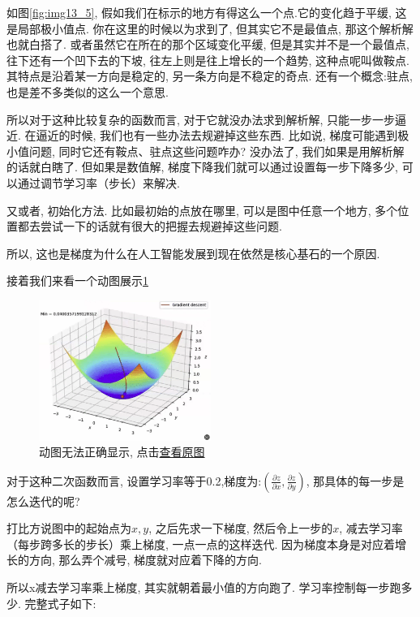 如图\ref{fig:img13_5}, 假如我们在标示的地方有得这么一个点.它的变化趋于平缓, 这是局部极小值点. 你在这里的时候以为求到了, 但其实它不是最值点, 那这个解析解也就白搭了. 或者虽然它在所在的那个区域变化平缓, 但是其实并不是一个最值点, 往下还有一个凹下去的下坡, 往左上则是往上增长的一个趋势, 这种点呢叫做鞍点. 其特点是沿着某一方向是稳定的, 另一条方向是不稳定的奇点. 还有一个概念:驻点, 也是差不多类似的这么一个意思. 

所以对于这种比较复杂的函数而言, 对于它就没办法求到解析解, 只能一步一步逼近. 在逼近的时候, 我们也有一些办法去规避掉这些东西. 比如说, 梯度可能遇到极小值问题, 同时它还有鞍点、驻点这些问题咋办? 没办法了, 我们如果是用解析解的话就白瞎了. 但如果是数值解, 梯度下降我们就可以通过设置每一步下降多少, 可以通过调节学习率（步长）来解决. 

又或者, 初始化方法. 比如最初始的点放在哪里, 可以是图中任意一个地方, 多个位置都去尝试一下的话就有很大的把握去规避掉这些问题. 

所以, 这也是梯度为什么在人工智能发展到现在依然是核心基石的一个原因. 

接着我们来看一个动图展示\ref{fig:img13_6}

\begin{figure}
  \centering
  \includegraphics[width=0.5\textwidth]{asset/截屏2023-12-31 16.01.00.png}
  \caption{动图无法正确显示, 点击\href{https://raw.githubusercontent.com/hivandu/notes/main/img/20230902191105.gif}{查看原图}}
  \label{fig:img13_6}
\end{figure}

对于这种二次函数而言, 设置学习率等于0.2,梯度为:$(\frac{\partial z}{\partial x}, \frac{\partial z}{\partial y})$, 那具体的每一步是怎么迭代的呢? 

打比方说图中的起始点为$x, y$, 之后先求一下梯度, 然后令上一步的$x$,  减去学习率（每步跨多长的步长）乘上梯度, 一点一点的这样迭代. 因为梯度本身是对应着增长的方向, 那么弄个减号, 梯度就对应着下降的方向. 

所以x减去学习率乘上梯度, 其实就朝着最小值的方向跑了. 学习率控制每一步跑多少. 完整式子如下:

